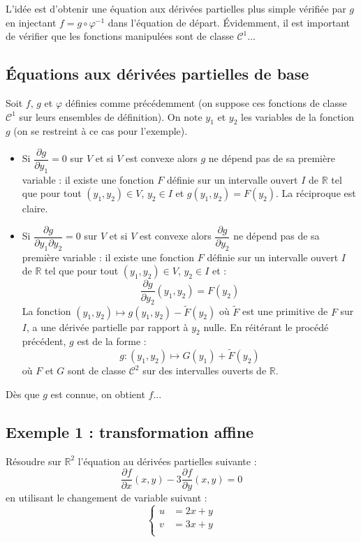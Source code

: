 \documentclass[a4paper,10pt]{report}
\begin{document}
\medskip

\noindent L'idée est d'obtenir une équation aux dérivées partielles plus simple vérifiée par $g$ en \og injectant \fg $f= g \circ \varphi^{-1}$ dans l'équation de départ. Évidemment, il est important de vérifier que les fonctions manipulées sont de classe $\mathcal{C}^1$...

\subsection{Équations aux dérivées partielles de base}
\noindent Soit $f$, $g$ et $\varphi$ définies comme précédemment (on suppose ces fonctions de classe $\mathcal{C}^1$ sur leurs ensembles de définition). On note $y_1$ et $y_2$ les variables de la fonction $g$ (on se restreint à ce cas pour l'exemple).

\begin{itemize}
\item Si $\dfrac{\partial g}{\partial y_1} =0$ sur $V$ et si $V$ est convexe alors $g$ ne dépend pas de sa première variable : il existe une fonction $F$ définie sur un intervalle ouvert $I$ de $\mathbb{R}$ tel que pour tout $(y_1,y_2) \in V$, $y_2 \in I$ et $g(y_1,y_2)=F(y_2)$. La réciproque est claire.
\item Si $\dfrac{\partial g}{\partial y_1 \partial y_2} =0$ sur $V$ et si $V$ est convexe alors $\dfrac{\partial g}{\partial y_2}$ ne dépend pas de sa première variable : il existe une fonction $F$ définie sur un intervalle ouvert $I$ de $\mathbb{R}$ tel que pour tout $(y_1,y_2) \in V$, $y_2 \in I$ et :
$$  \dfrac{\partial g}{\partial y_2}(y_1,y_2)=F(y_2)$$
La fonction $(y_1,y_2) \mapsto g(y_1,y_2) - \tilde{F}(y_2)$ où $\tilde{F}$ est une primitive de $F$ sur $I$, a une dérivée partielle par rapport à $y_2$ nulle. En réitérant le procédé précédent, $g$ est de la forme :
$$ g : (y_1,y_2) \mapsto G(y_1)+\tilde{F}(y_2)$$
où $F$ et $G$ sont de classe $\mathcal{C}^2$ sur des intervalles ouverts de $\mathbb{R}$.
\end{itemize}

\medskip

\noindent Dès que $g$ est connue, on obtient $f$...
\subsection{Exemple 1 : transformation affine}
\noindent Résoudre sur $\mathbb{R}^2$ l'équation au dérivées partielles suivante :
$$ \dfrac{\partial f}{\partial x}(x,y) - 3 \dfrac{\partial f}{\partial y}(x,y) = 0$$
en utilisant le changement de variable suivant :
$$ \left\lbrace \begin{array}{ccl}
u & = 2x+y \\
v& = 3x+y \\
\end{array}\right.$$
\end{document}
